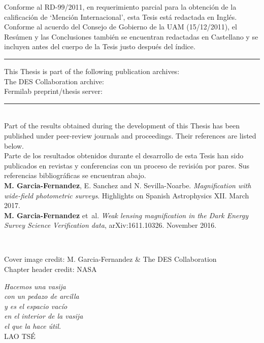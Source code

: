 \documentclass[12pt]{book} %
\begin{document}
\noindent
Conforme al RD-99/2011, en requerimiento parcial para la obtenci\'on de la calificaci\'on  de `Menci\'on Internacional', esta Tesis est\'a redactada en Ingl\'es.\\
Conforme al acuerdo del Consejo de Gobierno de la UAM (15/12/2011), el Res\'umen y las Conclusiones tambi\'en se encuentran redactadas en Castellano y se incluyen antes del cuerpo de la Tesis justo despu\'es del \'indice.
\vspace*{2cm}
\begin{flushleft}
\rule{\textwidth}{2pt}
This Thesis is part of the following publication archives:\\
The DES Collaboration archive:\\
Fermilab preprint/thesis server:\\
\rule{\textwidth}{2pt}\\
\vspace*{2cm}
\noindent
Part of the results obtained during the development of this Thesis has been published under peer-review journals and proceedings. Their references are listed below.\\

\noindent
Parte de los resultados obtenidos durante el desarrollo de esta Tesis han sido publicados en revistas y conferencias con un proceso de revisi\'on por pares. Sus referencias bibliogr\'aficas se encuentran abajo.\\
\vspace*{0.5cm}
{\bf M. Garcia-Fernandez}, E. Sanchez and N. Sevilla-Noarbe. {\it Magnification with wide-field photometric surveys}. Highlights on Spanish Astrophysics XII. March 2017.\\
\vspace*{0.5cm}
{\bf M. Garcia-Fernandez} et~al. {\it Weak lensing magnification in the Dark Energy Survey Science Verification data}, arXiv:1611.10326. November 2016.

~\vfill
\thispagestyle{empty}
\begin{footnotesize}
Cover image credit: M. Garcia-Fernandez \& The DES Collaboration\\
Chapter header credit: NASA
\end{footnotesize}
\end{flushleft}

\newpage
\thispagestyle{empty}
\begin{flushright}
\begin{large}
\vspace*{3cm}
{\it Hacemos una vasija\\ con un pedazo de arcilla\\ y es el espacio vac\'io\\ en el interior de la vasija\\ el que la hace \'util.}\\
\vspace{1cm}
LAO TS\'E\\
\end{large}
~\vfill
\end{flushright}
\end{document}
